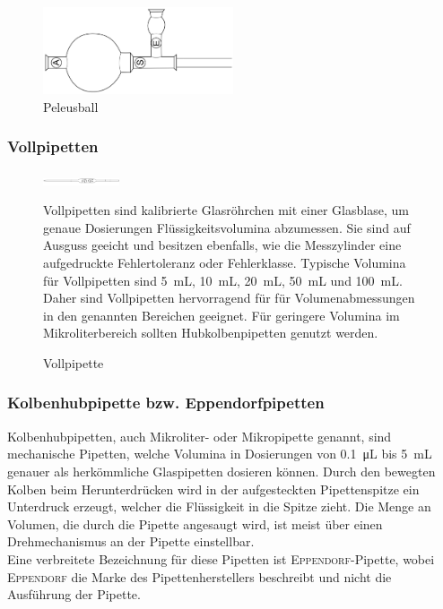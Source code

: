 \begin{figure}[h!]
	\centering
	\includegraphics[width=0.5\textwidth]{img/peleusball}
	\caption{Peleusball}
	\label{fig:peleus}
\end{figure}
\FloatBarrier

\subsubsection*{Vollpipetten}


\begin{figure}[h!]
	\begin{minipage}[t]{0.5\textwidth}
		\vspace{0pt}
		\centering
		\includegraphics[angle=90,width=0.2\textwidth]{img/vollpipette}
		\caption{Vollpipette}
		\label{fig:vollpipette}
	\end{minipage}
	\hfill
	\begin{minipage}[t]{0.5\textwidth}
		\vspace{0pt}
		Vollpipetten sind kalibrierte Glasröhrchen mit einer Glasblase, um genaue Dosierungen Flüssigkeitsvolumina abzumessen.  Sie sind auf Ausguss geeicht und besitzen ebenfalls, wie die Messzylinder eine aufgedruckte Fehlertoleranz oder Fehlerklasse. Typische Volumina für Vollpipetten sind \SI{5}{\milli \liter}, \SI{10}{\milli \liter}, \SI{20}{\milli \liter }, \SI{50}{\milli \liter } und \SI{100}{\milli \liter}. Daher sind Vollpipetten hervorragend für für Volumenabmessungen in den genannten Bereichen geeignet. Für geringere Volumina im Mikroliterbereich sollten Hubkolbenpipetten genutzt werden.
	\end{minipage}
\end{figure}
\FloatBarrier

\newpage

\subsubsection*{Kolbenhubpipette bzw. Eppendorfpipetten}
Kolbenhubpipetten, auch Mikroliter- oder Mikropipette genannt, sind mechanische Pipetten, welche Volumina in Dosierungen von \SI{0,1}{\micro \liter} bis \SI{5}{\milli \liter}  genauer als herkömmliche Glaspipetten dosieren können. Durch den bewegten Kolben beim Herunterdrücken wird in der aufgesteckten Pipettenspitze ein Unterdruck erzeugt, welcher die Flüssigkeit in die Spitze zieht. Die Menge an Volumen, die durch die Pipette angesaugt wird, ist meist über einen Drehmechanismus an der Pipette einstellbar.\\
Eine verbreitete Bezeichnung für diese Pipetten ist \mbox{\textsc{Eppendorf}}-Pipette, wobei \textsc{Eppendorf} die Marke des Pipettenherstellers beschreibt und nicht die Ausführung der Pipette.

